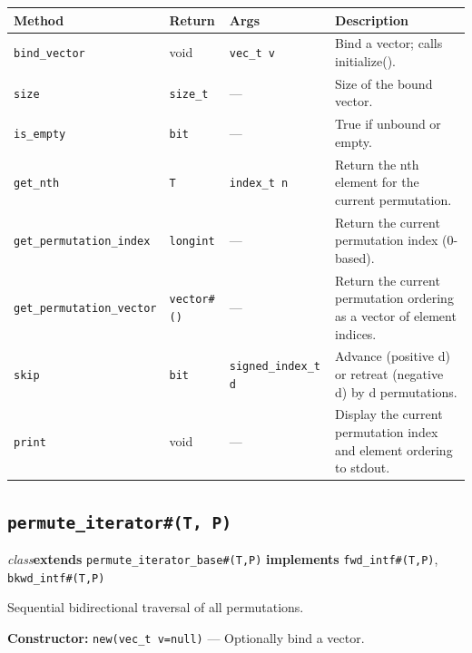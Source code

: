 \documentclass[11pt,letterpaper]{report}
\begin{document}
\begin{xltabular}{\linewidth}{>{\small}p{1.35in} >{\small}p{1.25in} >{\small}p{0.95in} >{\small}X}
\toprule
\textbf{Method} & \textbf{Return} & \textbf{Args} & \textbf{Description} \\
\midrule
\endhead
\bottomrule
\endfoot
\texttt{bind\_vector} & void & \texttt{vec\_t v} & Bind a vector; calls initialize(). \\
\texttt{size} & \texttt{size\_t} & --- & Size of the bound vector. \\
\texttt{is\_empty} & \texttt{bit} & --- & True if unbound or empty. \\
\texttt{get\_nth} & \texttt{T} & \texttt{index\_t n} & Return the nth element for the current permutation. \\
\texttt{get\_permutation\_index} & \texttt{longint} & --- & Return the current permutation index (0-based). \\
\texttt{get\_permutation\_vector} & \texttt{vector\#()} & --- & Return the current permutation ordering as a vector of element indices. \\
\texttt{skip} & \texttt{bit} & \texttt{signed\_index\_t d} & Advance (positive d) or retreat (negative d) by d permutations. \\
\texttt{print} & void & --- & Display the current permutation index and element ordering to stdout. \\
\end{xltabular}

\subsection*{\texttt{permute\_iterator\#(T, P)}}
\noindent\small\textit{class}\quad \textbf{extends} \texttt{permute\_iterator\_base\#(T,P)} \quad \textbf{implements} \texttt{fwd\_intf\#(T,P)}, \texttt{bkwd\_intf\#(T,P)}\par

Sequential bidirectional traversal of all permutations.

\noindent\textbf{Constructor:} \texttt{new(vec\_t v=null)} --- Optionally bind a vector.
\end{document}
